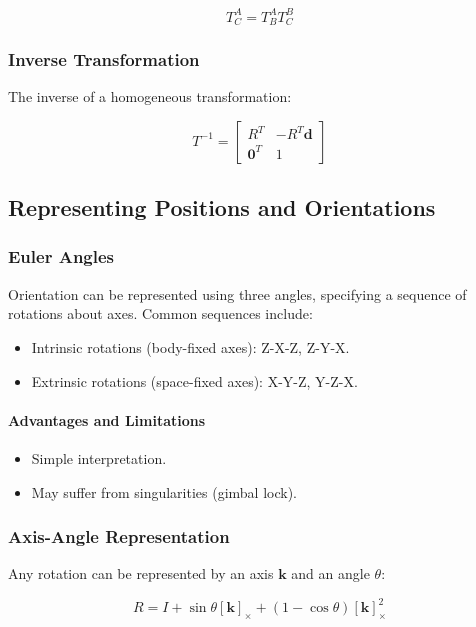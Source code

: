 \documentclass{article}
\begin{document}
$$
T^A_C = T^A_B T^B_C
$$

\subsubsection{Inverse Transformation}

The inverse of a homogeneous transformation:

$$
T^{-1} = \begin{bmatrix}
R^T & -R^T \mathbf{d} \\
\mathbf{0}^T & 1
\end{bmatrix}
$$

\subsection{Representing Positions and Orientations}

\subsubsection{Euler Angles}

Orientation can be represented using three angles, specifying a sequence of rotations about axes. Common sequences include:

\begin{itemize}
    \item Intrinsic rotations (body-fixed axes): Z-X-Z, Z-Y-X.
    \item Extrinsic rotations (space-fixed axes): X-Y-Z, Y-Z-X.
\end{itemize}

\paragraph{Advantages and Limitations}

\begin{itemize}
    \item Simple interpretation.
    \item May suffer from singularities (gimbal lock).
\end{itemize}

\subsubsection{Axis-Angle Representation}

Any rotation can be represented by an axis $\mathbf{k}$ and an angle $\theta$:

$$
R = I + \sin\theta [\mathbf{k}]_\times + (1 - \cos\theta) [\mathbf{k}]_\times^2
$$
\end{document}
